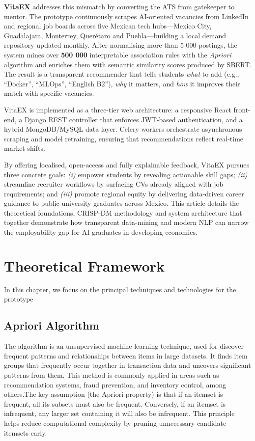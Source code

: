 \documentclass[runningheads]{llncs}
\begin{document}
\textbf{VitaEX} addresses this mismatch by converting the ATS from gatekeeper to mentor.  
The prototype continuously scrapes AI-oriented vacancies from LinkedIn and regional job boards across five Mexican tech hubs—Mexico City, Guadalajara, Monterrey, Querétaro and Puebla—building a local demand repository updated monthly.  
After normalising more than 5 000 postings, the system mines over \textbf{500 000} interpretable association rules with the \emph{Apriori} algorithm and enriches them with semantic similarity scores produced by SBERT.  
The result is a transparent recommender that tells students \emph{what} to add (e.g., “Docker”, “MLOps”, “English B2”), \emph{why} it matters, and \emph{how} it improves their match with specific vacancies.

VitaEX is implemented as a three-tier web architecture: a responsive React front-end, a Django REST controller that enforces JWT-based authentication, and a hybrid MongoDB/MySQL data layer.  
Celery workers orchestrate asynchronous scraping and model retraining, ensuring that recommendations reflect real-time market shifts.

By offering localised, open-access and fully explainable feedback, VitaEX pursues three concrete goals:  
\emph{(i)} empower students by revealing actionable skill gaps;  
\emph{(ii)} streamline recruiter workflows by surfacing CVs already aligned with job requirements; and  
\emph{(iii)} promote regional equity by delivering data-driven career guidance to public-university graduates across Mexico.  
This article details the theoretical foundations, CRISP-DM methodology and system architecture that together demonstrate how transparent data-mining and modern NLP can narrow the employability gap for AI graduates in developing economies.

	
	
	\section{Theoretical Framework}
	In this chapter, we focus on the principal techniques and technologies for the prototype
	\subsection{Apriori Algorithm}
	
	The algorithm is an unsupervised machine learning technique, used for discover frequent patterns and relationships between items in large datasets. It finds item groups that frequently occur together in transaction data and uncovers significant patterns from them. This method is commonly applied in areas such as recommendation systems, fraud prevention, and inventory control, among others.The key assumption (the Apriori property) is that if an itemset is frequent, all its subsets must also be frequent. Conversely, if an itemset is infrequent, any larger set containing it will also be infrequent. This principle helps reduce computational complexity by pruning unnecessary candidate itemsets early. \cite{ibm_apriori}
\end{document}
